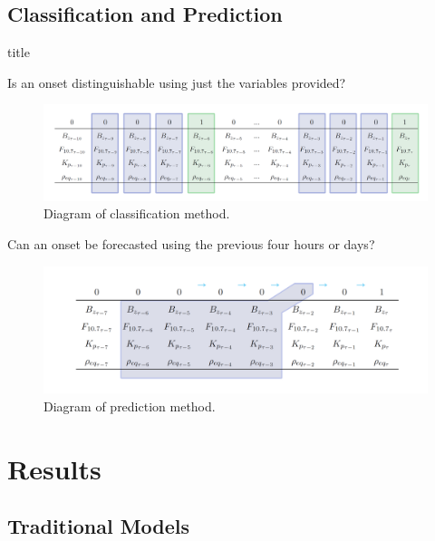 \documentclass[xcolor={dvipsnames,table}]{beamer}
\newcommand{\subheader}{    		\begin{center}
  	\begin{beamercolorbox}[sep=4pt,center,shadow=true,rounded=true]{title}
  		\usebeamerfont{title}\subsecname\par%
  	\end{beamercolorbox}
  	\vfill
  	\end{center}}
\begin{document}
\subsection{Classification and Prediction}

\begin{frame}
	\subheader
	Is an onset distinguishable using just the variables provided?
	\begin{figure}[htp!]
		\centering
		\includegraphics[width=1\linewidth]{Figures/CH5/ClassifyGraphic-2.png}
		\caption{Diagram of classification method.}
		\label{fig:ClassifyDiagram}
	\end{figure}
\end{frame}


\begin{frame}
	Can an onset be forecasted using the previous four hours or days?
	\begin{figure}[htp!]
		\centering
		\includegraphics[width=1\linewidth]{Figures/CH5/FullGraphic-2.png}
		\caption{Diagram of prediction method.}
		\label{fig:ClassifyDiagram}
	\end{figure}
	
	
\end{frame}

\section{Results}
\subsection{Traditional Models}
\end{document}
